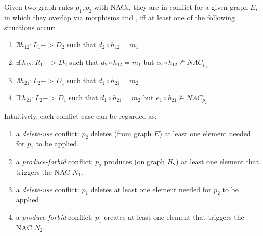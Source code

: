 \begin{definition}[Conflict]\label{def:classic-conflict} Given two graph rules $p_1, p_2$ with NACs, they are in conflict for a given graph $E$, in which they overlap via morphisms  and , iff at least one of the following situations occur:

\begin{enumerate}
    \item $\nexists h_{12} : L_1 -> D_2$ such that $d_2 \circ h_{12} = m_1$
    \item $\exists! h_{12} : R_1 -> D_2$ such that $d_2 \circ h_{12} = m_1$ but $e_2 \circ h_{12} \not\models NAC_{p_1}$
    \item $\nexists h_{21} : L_2 -> D_1$ such that $d_1 \circ h_{21} = m_2$
    \item $\exists! h_{21} : L_2 -> D_1$ such that $d_1 \circ h_{21} = m_2$ but $e_1 \circ h_{21} \not\models NAC_{p_2}$
  \end{enumerate}

\end{definition}

Intuitively, each conflict case can be regarded as:

\begin{enumerate}
  \item a \emph{delete-use} conflict: $p_2$ deletes (from graph $E$) at least one element needed for $p_1$ to be applied.
  \item a \emph{produce-forbid} conflict: $p_2$ produces (on graph $H_2$) at least one element that triggers the NAC $N_1$.
  \item a \emph{delete-use} conflict: $p_1$ deletes at least one element needed for $p_2$ to be applied
  \item a \emph{produce-forbid} conflict: $p_1$ creates at least one element that triggers the NAC $N_2$.
\end{enumerate}

